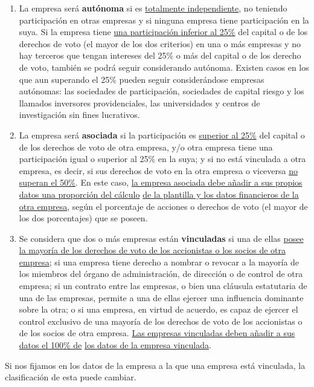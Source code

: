 \documentclass[12pt,a4paper,spanish]{report}
\begin{document}
				\begin{enumerate}
					\item La empresa será \textbf{autónoma} si es \underline{totalmente independiente}, no teniendo participación en otras empresas y si ninguna empresa tiene participación en la suya. Si la empresa tiene \underline{una participación inferior al 25\%} del capital o de  los derechos de voto (el mayor de los dos criterios) en una o más empresas y no hay terceros que tengan intereses del 25\% o más del capital o de los derecho de voto, también se podrá seguir considerando autónoma. Existen casos en los que aun superando el 25\% pueden seguir considerándose empresas autónomas: las sociedades de participación, sociedades de capital riesgo y los llamados inversores providenciales, las universidades y centros de investigación sin fines lucrativos.

					\item La empresa será \textbf{asociada} si la participación es \underline{superior al 25\%} del capital o de los derechos de voto de otra empresa, y/o otra empresa tiene una participación igual o superior al 25\% en la suya; y si no está vinculada a otra empresa, es decir, si sus derechos de voto en la otra empresa o viceversa \underline{no superan el 50\%}. En este caso, \underline{la empresa asociada debe añadir a sus propios datos una proporción del cálculo} \underline{de la plantilla y los datos financieros de la otra empresa}, según el porcentaje de acciones o derechos de voto (el mayor de los dos porcentajes) que se poseen.

					\item Se considera que dos o más empresas están \textbf{vinculadas} si una de ellas \underline{posee la mayoría de los derechos de voto de los accionistas o los socios de otra empresa}; si una empresa tiene derecho a nombrar o revocar a la mayoría de los miembros del órgano de administración, de dirección o de control de otra empresa; si un contrato entre las empresas, o bien una cláusula estatutaria de una de las empresas, permite a una de ellas ejercer una influencia dominante sobre la otra; o si una empresa, en virtud de acuerdo, es capaz de ejercer el control exclusivo de una mayoría de los derechos de voto de los accionistas o de los socios de otra empresa. \underline{Las empresas vinculadas deben añadir a sus datos el 100\% de} \underline{los datos de la empresa vinculada}.
				\end{enumerate}
				Si nos fijamos en los datos de la empresa a la que una empresa está vinculada, la clasificación de esta puede cambiar.
\end{document}
